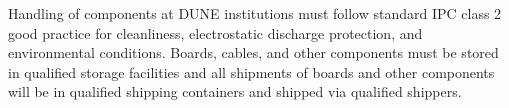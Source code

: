 Handling of  components at DUNE institutions must follow standard IPC class 2 good practice for cleanliness, electrostatic discharge protection, and environmental conditions. Boards, cables, and other  components must be stored in qualified storage facilities and all shipments of boards and other components will be in qualified shipping containers and shipped via qualified shippers.
